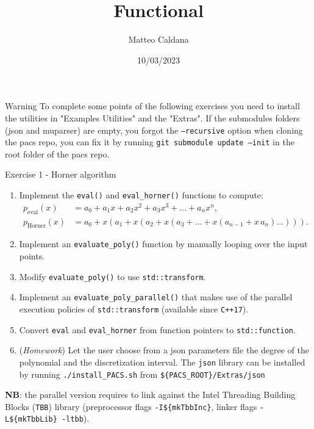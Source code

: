\documentclass[10pt,aspectratio=169]{beamer}
\begin{document}
    \title{Functional}
    \author{Matteo Caldana}
    \date{10/03/2023}
    
\begin{frame}
    \maketitle
\end{frame}

\begin{frame}{Warning}
    To complete some points of the following exercises you need to install the utilities in "Examples Utilities" and the "Extras". If the submodules folders (json and muparser) are empty, you forgot the \texttt{--recursive} option when cloning the pacs repo, you can fix it by running \texttt{git submodule update --init} in the root folder of the pacs repo.
\end{frame}

\begin{frame}{Exercise 1 - Horner algorithm}
\begin{enumerate}
\item Implement the \texttt{eval()} and \texttt{eval\_horner()} functions to compute:
\begin{align*}
p_\text{eval}(x) &= a_0 + a_1x + a_2x^2 + a_3x^3 + \ldots + a_nx^n, \\
p_\text{Horner}(x) &= a_0 + x \left(a_1 + x \left(a_2 + x \left(a_3 + \ldots + x\left(a_{n-1} + x \, a_n\right) \ldots \right) \right) \right).
\end{align*}
\item Implement an \texttt{evaluate\_poly()} function by manually looping over the input points.
\item Modify \texttt{evaluate\_poly()} to use \texttt{std::transform}.
\item Implement an \texttt{evaluate\_poly\_parallel()} that makes use of the parallel execution policies of \texttt{std::transform} (available since \texttt{C++17}).
\item Convert \texttt{eval} and \texttt{eval\_horner} from function pointers to \texttt{std::function}.
\item (\textit{Homework}) Let the user choose from a json parameters file the degree of the polynomial and the discretization interval. The \texttt{json} library can be installed by running \texttt{./install\_PACS.sh} from \texttt{\$\{PACS\_ROOT\}/Extras/json}
\end{enumerate}

\textbf{NB}: the parallel version requires to link against the Intel Threading Building Blocks (\texttt{TBB}) library (preprocessor flags \texttt{-I\$\{mkTbbInc\}}, linker flags \texttt{-L\$\{mkTbbLib\} -ltbb}).
\end{frame}
\end{document}
